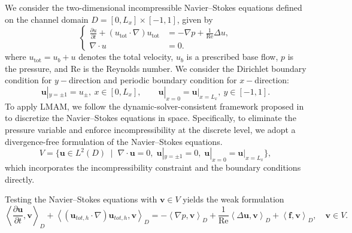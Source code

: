 \documentclass[a4paper,fleqn, 12pt]{cas-sc}
\numberwithin{table}{section}
\begin{document}
We consider the two-dimensional incompressible Navier--Stokes equations defined on the channel
domain $D = [0,L_x] \times [-1,1]$, given by
\begin{equation}
\left\{
\begin{aligned}
\frac{\partial u}{\partial t} + (u_{\mathrm{tot}}\cdot\nabla)u_{\mathrm{tot}}
&= -\nabla p + \frac{1}{\mathrm{Re}} \Delta u, \\
\nabla\cdot u &= 0.
\end{aligned}
\right.
\label{eq:ns}
\end{equation}
where $u_{\mathrm{tot}} = u_b + u$ denotes the total velocity, $u_b$ is a prescribed base flow,
$p$ is the pressure, and $\mathrm{Re}$ is the Reynolds number.
 We consider the Dirichlet boundary condition for $y-$direction
 and periodic boundary condition for $x-$direction:
 \begin{equation} \label{eq:ns-bc}
    \mathbf{u}|_{y=\pm1}=u_{\pm},\ x\in [0,L_x], 
    \qquad
    \mathbf{u}|_{x=0}=\mathbf{u} |_{x=L_x},\ y\in [-1,1].
 \end{equation}
To apply LMAM, we follow the dynamic-solver-consistent framework proposed in
\cite{wan_dynamic_2017, moser1983spectral} to discretize the Navier--Stokes equations in space.
Specifically, to eliminate the pressure variable and enforce incompressibility at the discrete level,
we adopt a divergence-free formulation of the Navier--Stokes equations.
\begin{equation}
	V =
	\bigl\{
	\mathbf{u}\in L^{2}(D)\;
    \mid
    \;
	\nabla\cdot\mathbf{u}=0,\;
	\mathbf{u}|_{y=\pm1}=0,\;
	\mathbf{u}|_{x=0}=\mathbf{u}|_{x=L_x}
	\bigr\},
	\label{space}
\end{equation}
which incorporates the incompressibility constraint and the boundary conditions directly.

Testing the Navier--Stokes equations with $\mathbf{v}\in V$ yields the weak formulation
\begin{equation}
	\left\langle \frac{\partial\mathbf{u}}{\partial t},\mathbf{v}\right\rangle _{D}+\left\langle (\mathbf{u}_{tot,h}\cdot\nabla)\mathbf{u}_{tot,h},\mathbf{v}\right\rangle _{D}=-\left\langle \nabla p,\mathbf{v}\right\rangle_D +\frac{1}{\mathrm{Re}}\left\langle \Delta\mathbf{u},\mathbf{v}\right\rangle _{D}+\left\langle \mathbf{f},\mathbf{v}\right\rangle_D, \quad \mathbf{v} \in V. \label{eq:inn}
\end{equation}
\end{document}
